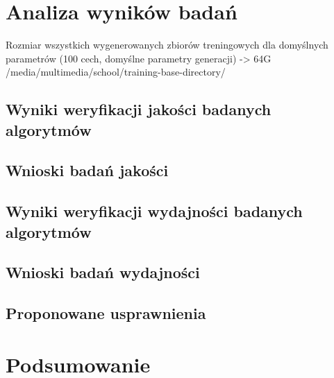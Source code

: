 \chapter{Analiza wyników badań}\label{Chapter_AnalizaRezultatow}

  Rozmiar wszystkich wygenerowanych zbiorów treningowych dla domyślnych parametrów (100 cech, domyślne parametry generacji) -> 64G /media/multimedia/school/training-base-directory/

  \section{Wyniki weryfikacji jakości badanych algorytmów}\label{Section_Quality}

  \section{Wnioski badań jakości}\label{Section_QualityWnioski}

  \section{Wyniki weryfikacji wydajności badanych algorytmów}\label{Section_Performance}

  \section{Wnioski badań wydajności}\label{Section_PerformanceWnioski}

  \section{Proponowane usprawnienia}\label{Section_Usprawnienia}

\chapter{Podsumowanie}\label{Section_Podsumowanie}